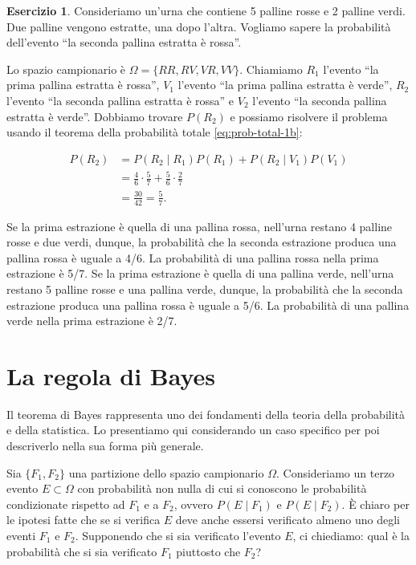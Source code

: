 \documentclass[
  11pt,
]{krantz}
\theoremstyle{definition}
\theoremstyle{definition}
\theoremstyle{definition}
\newtheorem{exercise}{Esercizio}[chapter]
\theoremstyle{definition}
\theoremstyle{remark}
\begin{document}
\begin{exercise}
Consideriamo un'urna che contiene 5 palline rosse e 2 palline verdi. Due palline vengono estratte, una dopo l'altra. Vogliamo sapere la probabilità dell'evento ``la seconda pallina estratta è rossa''.

Lo spazio campionario è \(\Omega = \{RR, RV, VR, VV\}\). Chiamiamo \(R_1\) l'evento ``la prima pallina estratta è rossa'', \(V_1\) l'evento ``la prima pallina estratta è verde'', \(R_2\) l'evento ``la seconda pallina estratta è rossa'' e \(V_2\) l'evento ``la seconda pallina estratta è verde''. Dobbiamo trovare \(P(R_2)\) e possiamo risolvere il problema usando il teorema della probabilità totale \eqref{eq:prob-total-1b}:

\[
\begin{split}
P(R_2) &= P(R_2 \mid R_1) P(R_1) + P(R_2 \mid V_1)P(V_1)\\
&= \frac{4}{6} \cdot \frac{5}{7} + \frac{5}{6} \cdot \frac{2}{7} \\
&= \frac{30}{42} = \frac{5}{7}.
\end{split}
\]

Se la prima estrazione è quella di una pallina rossa, nell'urna restano 4 palline rosse e due verdi, dunque, la probabilità che la seconda estrazione produca una pallina rossa è uguale a 4/6. La probabilità di una pallina rossa nella prima estrazione è 5/7. Se la prima estrazione è quella di una pallina verde, nell'urna restano 5 palline rosse e una pallina verde, dunque, la probabilità che la seconda estrazione produca una pallina rossa è uguale a 5/6. La probabilità di una pallina verde nella prima estrazione è 2/7.
\end{exercise}

\hypertarget{la-regola-di-bayes}{%
\section{La regola di Bayes}\label{la-regola-di-bayes}}

Il teorema di Bayes rappresenta uno dei fondamenti della teoria della probabilità e della statistica. Lo presentiamo qui considerando un caso specifico per poi descriverlo nella sua forma più generale.

Sia \(\{F_1, F_2\}\) una partizione dello spazio campionario \(\Omega\). Consideriamo un terzo evento \(E \subset \Omega\) con probabilità non nulla di cui si conoscono le probabilità condizionate rispetto ad \(F_1\) e a \(F_2\), ovvero \(P(E \mid F_1)\) e \(P(E \mid F_2)\). È chiaro per le ipotesi fatte che se si verifica \(E\) deve anche essersi verificato almeno uno degli eventi \(F_1\) e \(F_2\). Supponendo che si sia verificato l'evento \(E\), ci chiediamo: qual è la probabilità che si sia verificato \(F_1\) piuttosto che \(F_2\)?
\end{document}
